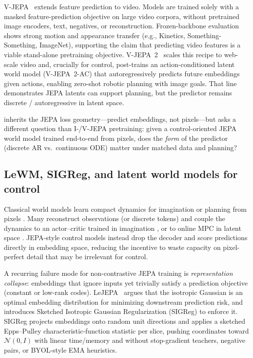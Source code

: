 V-JEPA~\cite{bardes2024vjepa} extends feature prediction to video.
Models are trained solely with a masked feature-prediction objective
on large video corpora, without pretrained image encoders, text,
negatives, or reconstruction.
Frozen-backbone evaluation shows strong motion and appearance
transfer (e.g., Kinetics, Something-Something, ImageNet), supporting
the claim that predicting video features is a viable stand-alone
pretraining objective.
V-JEPA~2~\cite{assran2025vjepa2} scales this recipe to web-scale video
and, crucially for control, post-trains an action-conditioned latent
world model (V-JEPA~2-AC) that autoregressively predicts future
embeddings given actions, enabling zero-shot robotic planning with
image goals.
That line demonstrates JEPA latents can support planning, but the
predictor remains discrete / autoregressive in latent space.

\method{} inherits the JEPA loss geometry---predict embeddings, not
pixels---but asks a different question than I-/V-JEPA pretraining:
given a control-oriented JEPA world model trained end-to-end from
pixels, does the \emph{form} of the predictor (discrete AR vs.\
continuous ODE) matter under matched data and planning?

\subsection{LeWM, SIGReg, and latent world models for control}
\label{sec:rel-lewm}

Classical world models learn compact dynamics for imagination or
planning from pixels
\cite{ha2018worldmodels,hafner2019planet,hafner2020dreamer}.
Many reconstruct observations (or discrete tokens) and couple the
dynamics to an actor--critic trained in imagination
\cite{hafner2020dreamer,hafner2023dreamerv3}, or to online MPC in
latent space \cite{hansen2022tdmpc}.
JEPA-style control models instead drop the decoder and score
predictions directly in embedding space, reducing the incentive to
waste capacity on pixel-perfect detail that may be irrelevant for
control.

A recurring failure mode for non-contrastive JEPA training is
\emph{representation collapse}: embeddings that ignore inputs yet
trivially satisfy a prediction objective (constant or low-rank
codes).
LeJEPA~\cite{balestriero2025lejepa} argues that the isotropic Gaussian
is an optimal embedding distribution for minimizing downstream
prediction risk, and introduces Sketched Isotropic Gaussian
Regularization (SIGReg) to enforce it.
SIGReg projects embeddings onto random unit directions and applies a
sketched Epps--Pulley characteristic-function statistic per slice,
pushing coordinates toward $\mathcal{N}(0,I)$ with linear
time/memory and without stop-gradient teachers, negative pairs, or
BYOL-style EMA heuristics.

